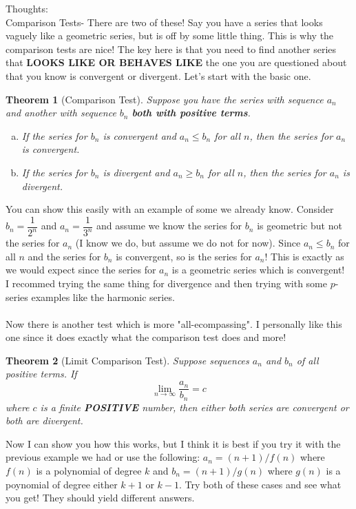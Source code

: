 \documentclass[10pt]{article}
\theoremstyle{Theorem}
\newtheorem{theorem}{Theorem}[section]
\theoremstyle{definition}
\theoremstyle{remark}
\theoremstyle{custom}
\begin{document}
\thispagestyle{firststyle}
\pagestyle{plain}


\noindent Thoughts: \\
Comparison Tests- There are two of these! Say you have a series that looks vaguely like a geometric series, but is off by some little thing. This is why the comparison tests are nice! The key here is that you need to find another series that \textbf{LOOKS LIKE OR BEHAVES LIKE} the one you are questioned about that you know is convergent or divergent. Let's start with the basic one. 
\begin{theorem}[Comparison Test]
Suppose you have the series with sequence $a_n$ and another with sequence $b_n$ \textbf{both with positive terms}.
\begin{enumerate}[a.]
\item If the series for $b_n$ is convergent and $a_n\leq b_n$ for all $n$, then the series for $a_n$ is convergent.
\item If the series for $b_n$ is divergent and $a_n\geq b_n$ for all $n$, then the series for $a_n$ is divergent.
\end{enumerate}

\end{theorem}
\noindent You can show this easily with an example of some we already know. Consider $b_n=\dfrac{1}{2^n}$ and $a_n=\dfrac{1}{3^n}$ and assume we know the series for $b_n$ is geometric but not the series for $a_n$ (I know we do, but assume we do not for now). Since $a_n\leq b_n$ for all $n$ and the series for $b_n$ is convergent, so is the series for $a_n$! This is exactly as we would expect since the series for $a_n$ is a geometric series which is convergent!\\
I recommed trying the same thing for divergence and then trying with some $p$-series examples like the harmonic series.\\\\
Now there is another test which is more "all-ecompassing". I personally like this one since it does exactly what the comparison test does and more! 
\begin{theorem}[Limit Comparison Test]
Suppose sequences $a_n$ and $b_n$ of all positive terms. If 
\[
\lim_{n\rightarrow \infty}\dfrac{a_n}{b_n}=c
\]
where $c$ is a finite \textbf{POSITIVE} number, then either both series are convergent or both are divergent. 
\end{theorem}
\noindent Now I can show you how this works, but I think it is best if you try it with the previous example we had or use the following: $a_n=(n+1)/f(n)$ where $f(n)$ is a polynomial of degree $k$ and $b_n=(n+1)/g(n)$ where $g(n)$ is a poynomial of degree either $k+1$ or $k-1$. Try both of these cases and see what you get! They should yield different answers.
\end{document}
